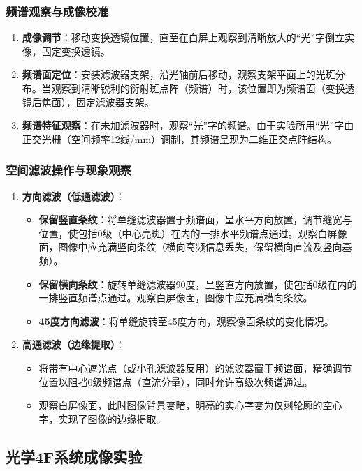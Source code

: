 \documentclass[11pt]{article}
\begin{document}
\subsubsection{频谱观察与成像校准}
\begin{enumerate}
    \item \textbf{成像调节}：移动变换透镜位置，直至在白屏上观察到清晰放大的“光”字倒立实像，固定变换透镜。
    \item \textbf{频谱面定位}：安装滤波器支架，沿光轴前后移动，观察支架平面上的光斑分布。当观察到清晰锐利的衍射斑点阵（频谱）时，该位置即为频谱面（变换透镜后焦面），固定滤波器支架。
    \item \textbf{频谱特征观察}：在未加滤波器时，观察“光”字的频谱。由于实验所用“光”字由正交光栅（空间频率12线/mm）调制，其频谱呈现为二维正交点阵结构。
\end{enumerate}

\subsubsection{空间滤波操作与现象观察}
\begin{enumerate}
    \item \textbf{方向滤波（低通滤波）}：
    \begin{itemize}
        \item \textbf{保留竖直条纹}：将单缝滤波器置于频谱面，呈水平方向放置，调节缝宽与位置，使包括0级（中心亮斑）在内的一排水平频谱点通过。观察白屏像面，图像中应充满竖向条纹（横向高频信息丢失，保留横向直流及竖向基频）。
        \item \textbf{保留横向条纹}：旋转单缝滤波器90度，呈竖直方向放置，使包括0级在内的一排竖直频谱点通过。观察白屏像面，图像中应充满横向条纹。
        \item \textbf{45度方向滤波}：将单缝旋转至45度方向，观察像面条纹的变化情况。
    \end{itemize}
    \item \textbf{高通滤波（边缘提取）}：
    \begin{itemize}
        \item 将带有中心遮光点（或小孔滤波器反用）的滤波器置于频谱面，精确调节位置以阻挡0级频谱点（直流分量），同时允许高级次频谱通过。
        \item 观察白屏像面，此时图像背景变暗，明亮的实心字变为仅剩轮廓的空心字，实现了图像的边缘提取。
    \end{itemize}
\end{enumerate}

\subsection{光学4F系统成像实验}
\end{document}
